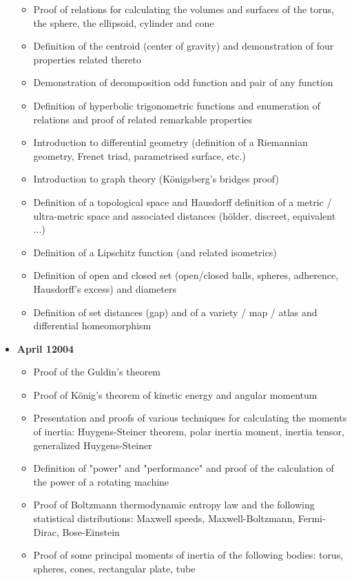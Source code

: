 \begin{itemize}
\begin{itemize}[noitemsep]
			\item Proof of relations for calculating the volumes and surfaces of the torus, the sphere, the ellipsoid, cylinder and cone
			\item Definition of the centroid (center of gravity) and demonstration of four properties related thereto
			\item Demonstration of decomposition odd function and pair of any function
			\item Definition of hyperbolic trigonometric functions and enumeration of relations and proof of related remarkable properties
			\item Introduction to differential geometry (definition of a Riemannian geometry, Frenet triad, parametrised surface, etc.)
			\item Introduction to graph theory (Königsberg's bridges proof)
			\item Definition of a topological space and Hausdorff definition of a metric / ultra-metric space and associated distances (hölder, discreet, equivalent ...)
			\item Definition of a Lipschitz function (and related isometrics)
			\item Definition of open and closed set (open/closed balls, spheres, adherence, Hausdorff's excess) and diameters
			\item Definition of set distances (gap) and of a variety / map / atlas and differential homeomorphism
		\end{itemize}
	\item \textbf{April 12004}
		\begin{itemize}[noitemsep]
			\item Proof of the Guldin's theorem
			\item Proof of König's theorem of kinetic energy and angular momentum
			\item Presentation and proofs of various techniques for calculating the moments of inertia: Huygens-Steiner theorem, polar inertia moment, inertia tensor, generalized Huygens-Steiner
			\item Definition of "power" and "performance" and proof of the calculation of the power of a rotating machine
			\item Proof of Boltzmann thermodynamic entropy law and the following statistical distributions: Maxwell speeds, Maxwell-Boltzmann, Fermi-Dirac, Bose-Einstein
			\item Proof of some principal moments of inertia of the following bodies: torus, spheres, cones, rectangular plate, tube

\end{itemize}
\end{itemize}
